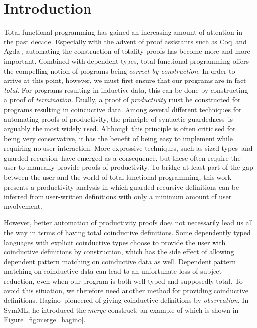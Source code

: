 \chapter{Introduction}

Total functional programming has gained an increasing amount of attention in the
past decade. Especially with the advent of proof assistants such as
Coq\,\citep{Coq:manual} and Agda\,\citep{Norell:thesis}, automating
the construction of totality proofs has become more and more important. Combined
with dependent types, total functional programming offers the compelling notion
of programs being \emph{correct by construction}. In order to arrive at this
point, however, we must first ensure that our programs are in fact
\emph{total}. For programs resulting in inductive data, this can be done by constructing a proof of
\emph{termination}. Dually, a proof of \emph{productivity}
must be constructed for programs resulting in coinductive data. Among several
different techniques for automating proofs of productivity, the principle of
syntactic guardedness\,\citep{Coquand94} is arguably the most widely used. Although this principle
is often criticised for being very conservative, it has the benefit of being easy
to implement while requiring no user interaction. More expressive techniques,
such as sized types\,\citep{Abel99terminationchecking} and guarded
recursion\,\citep{Nakano:2000} have emerged as a consequence, but these often
require the user to manually provide proofs of productivity. To bridge at least
part of the gap between the user and the world of total functional programming,
this work presents a productivity analysis in which guarded recursive definitions
can be inferred from user-written definitions with only a minimum amount of user
involvement.

However, better automation of productivity proofs does not necessarily lead us
all the way in terms of having total coinductive definitions. Some dependently
typed languages with explicit coinductive types choose to provide the user with
coinductive definitions by construction, which has the side effect of allowing
dependent pattern matching on coinductive data as well. Dependent pattern
matching on coinductive data can lead to an
unfortunate loss of subject reduction, even when our program is both well-typed
and supposedly total. To avoid this situation, we therefore need another method
for providing coinductive definitions. Hagino\,\citep{Hagino89} pioneered of
giving coinductive definitions by \emph{observation}. In SymML, he introduced
the \emph{merge} construct, an example of which is shown in Figure~\ref{fig:merge_hagino}.

